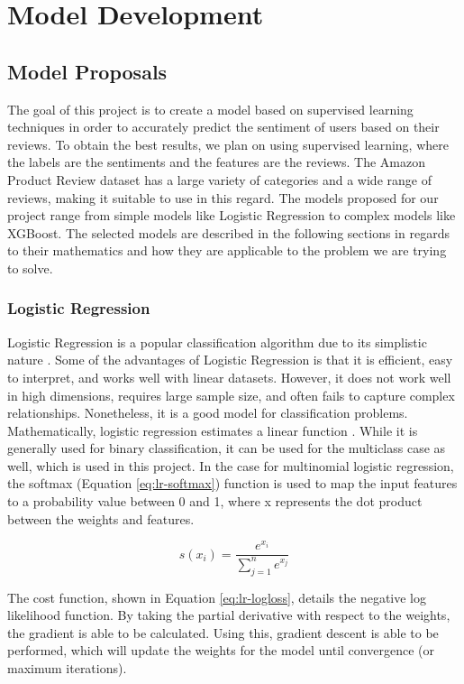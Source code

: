 \documentclass[stu,12pt,floatsintext]{apa7}
\let\oldsection\section
\renewcommand{\section}{\newpage\oldsection}
\begin{document}
\section{Model Development}
\subsection{Model Proposals}
The goal of this project is to create a model based on supervised learning techniques in order to accurately predict the sentiment of users based on their reviews. To obtain the best results, we plan on using supervised learning, where the labels are the sentiments and the features are the reviews. The Amazon Product Review dataset has a large variety of categories and a wide range of reviews, making it suitable to use in this regard. The models proposed for our project range from simple models like Logistic Regression to complex models like XGBoost. The selected models are described in the following sections in regards to their mathematics and how they are applicable to the problem we are trying to solve. 

\subsubsection{Logistic Regression}
Logistic Regression is a popular classification algorithm due to its simplistic nature \parencite{scikit-learn}. Some of the advantages of Logistic Regression is that it is efficient, easy to interpret, and works well with linear datasets. However, it does not work well in high dimensions, requires large sample size, and often fails to capture complex relationships. Nonetheless, it is a good model for classification problems. Mathematically, logistic regression estimates a linear function \parencite{prabhat2017sentiment}. While it is generally used for binary classification, it can be used for the multiclass case as well, which is used in this project. In the case for multinomial logistic regression, the softmax (Equation \ref{eq:lr-softmax}) function is used to map the input features to a probability value between 0 and 1, where x represents the dot product between the weights and features.






\begin{equation}
    s(x_i)=\frac{e^{x_i}}{\sum_{j=1}^{n}e^{x_j}}
    \label{eq:lr-softmax}
\end{equation}

The cost function, shown in Equation \ref{eq:lr-logloss}, details the negative log likelihood function. By taking the partial derivative with respect to the weights, the gradient is able to be calculated. Using this, gradient descent is able to be performed, which will update the weights for the model until convergence (or maximum iterations).
\end{document}
